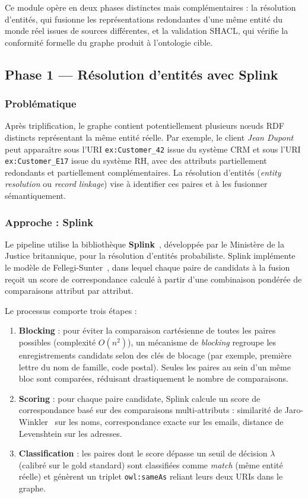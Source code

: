 Ce module opère en deux phases distinctes mais complémentaires :
la résolution d'entités, qui fusionne les représentations redondantes d'une
même entité du monde réel issues de sources différentes, et la validation SHACL,
qui vérifie la conformité formelle du graphe produit à l'ontologie cible.

\subsection{Phase 1 — Résolution d'entités avec Splink}

\subsubsection{Problématique}
Après triplification, le graphe contient potentiellement plusieurs nœuds RDF
distincts représentant la même entité réelle.
Par exemple, le client \textit{Jean Dupont} peut apparaître sous l'URI
\texttt{ex:Customer\_42} issue du système CRM et sous l'URI
\texttt{ex:Customer\_E17} issue du système RH, avec des attributs partiellement
redondants et partiellement complémentaires.
La résolution d'entités (\textit{entity resolution} ou \textit{record linkage})
vise à identifier ces paires et à les fusionner sémantiquement.

\subsubsection{Approche : Splink}
Le pipeline utilise la bibliothèque \textbf{Splink}~\cite{splink2023},
développée par le Ministère de la Justice britannique, pour la résolution
d'entités probabiliste.
Splink implémente le modèle de Fellegi-Sunter~\cite{fellegi1969theory},
dans lequel chaque paire de candidats à la fusion reçoit un score de
correspondance calculé à partir d'une combinaison pondérée de comparaisons
attribut par attribut.

Le processus comporte trois étapes :
\begin{enumerate}
    \item \textbf{Blocking} : pour éviter la comparaison cartésienne de toutes
          les paires possibles (complexité $O(n^2)$), un mécanisme de
          \textit{blocking} regroupe les enregistrements candidats selon des
          clés de blocage (par exemple, première lettre du nom de famille,
          code postal).
          Seules les paires au sein d'un même bloc sont comparées,
          réduisant drastiquement le nombre de comparaisons.
    \item \textbf{Scoring} : pour chaque paire candidate, Splink calcule un
          score de correspondance basé sur des comparaisons multi-attributs :
          similarité de Jaro-Winkler~\cite{winkler1990string} sur les noms,
          correspondance exacte sur les emails, distance de Levenshtein sur
          les adresses.
    \item \textbf{Classification} : les paires dont le score dépasse un seuil
          de décision $\lambda$ (calibré sur le gold standard) sont classifiées
          comme \textit{match} (même entité réelle) et génèrent un triplet
          \texttt{owl:sameAs} reliant leurs deux URIs dans le graphe.
\end{enumerate}

